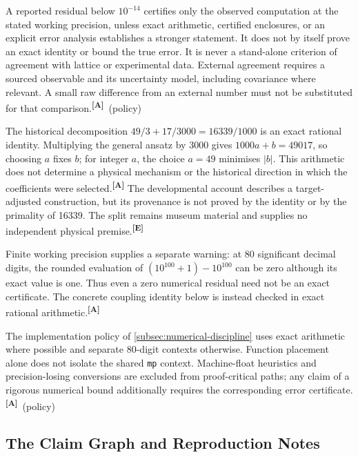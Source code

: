 \documentclass[12pt,a4paper,twoside]{article}
\theoremstyle{plain}
\theoremstyle{definition}
\theoremstyle{remark}
\newcommand{\catmark}[1]{\textsuperscript{\textsf{\textbf{[#1]}}}}
\begin{document}
\begin{governancebox}
A reported residual below $10^{-14}$ certifies only the observed computation
at the stated working precision, unless exact arithmetic, certified enclosures,
or an explicit error analysis establishes a stronger statement. It does not
by itself prove an exact identity or bound the true error. It is never a
stand-alone criterion of agreement with lattice or experimental data.
External agreement requires a sourced observable and its uncertainty model,
including covariance where relevant. A small raw difference from an external
number must not be substituted for that comparison.\catmark{A}\ (policy)
\end{governancebox}

\noindent The historical decomposition $49/3+17/3000=16339/1000$ is an
exact rational identity. Multiplying the general ansatz by 3000 gives
$1000a+b=49017$, so choosing $a$ fixes $b$; for integer $a$, the choice
$a=49$ minimises $|b|$. This arithmetic does not determine a physical
mechanism or the historical direction in which the coefficients were
selected.\catmark{A} The developmental account describes a target-adjusted
construction, but its provenance is not proved by the identity or by the
primality of 16339. The split remains museum material and supplies no
independent physical premise.\catmark{E}

Finite working precision supplies a separate warning: at 80 significant
decimal digits, the rounded evaluation of $(10^{100}+1)-10^{100}$ can be
zero although its exact value is one. Thus even a zero numerical residual
need not be an exact certificate. The concrete coupling identity below is
instead checked in exact rational arithmetic.\catmark{A}

The implementation policy of \cref{subsec:numerical-discipline} uses exact
arithmetic where possible and separate 80-digit contexts otherwise.
Function placement alone does not isolate the shared \texttt{mp} context.
Machine-float heuristics and precision-losing conversions are excluded from
proof-critical paths; any claim of a rigorous numerical bound additionally
requires the corresponding error certificate.\catmark{A}\ (policy)

\subsection{The Claim Graph and Reproduction Notes}
\label{subsec:claim-graph}
\end{document}
